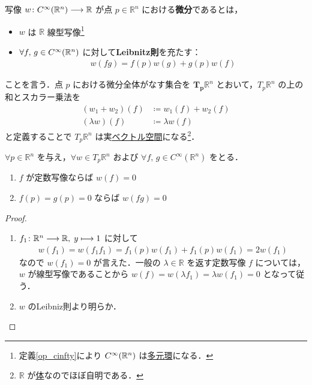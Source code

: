 \documentclass[geometry_main]{subfiles}
\begin{document}
写像 $w \colon C^\infty(\mathbb{R}^n) \longrightarrow \mathbb{R}$ が点 $p \in \mathbb{R}^n$ における\textbf{微分}であるとは，
\begin{itemize}
	\item $w$ は $\mathbb{R}$ 線型写像\footnote{定義\ref{op_cinfty}により $C^\infty(\mathbb{R}^n)$ は\hyperref[ax.alg]{多元環}になる．}
	\item $\forall f,\, g \in C^\infty(\mathbb{R}^n)$ に対して\textbf{Leibnitz則}を充たす：
	\begin{align}
		w(fg) = f(p) w(g) + g(p) w(f)
	\end{align}
\end{itemize}
ことを言う．点 $p$ における微分全体がなす集合を $\bm{T_p} \mathbb{R}^n$ とおいて，$T_p \mathbb{R}^n$ の上の和とスカラー乗法を
\begin{align}
	(w_1 + w_2)(f) &\coloneqq w_1(f) + w_2(f) \\
	(\lambda w)(f) &\coloneqq \lambda w(f)
\end{align}
と定義することで $T_p \mathbb{R}^n$ は実\hyperref[ax.vector]{ベクトル空間}になる\footnote{$\mathbb{R}$ が\hyperref[ax.ring]{体}なのでほぼ自明である．}．

\begin{mylem}[label=lem:tangentv-Rn]{}
	$\forall p \in \mathbb{R}^n$ を与え，$\forall w \in T_p \mathbb{R}^n$ および $\forall f,\, g \in C^\infty(\mathbb{R}^n)$ をとる．
	\begin{enumerate}
		\item $f$ が定数写像ならば $w(f) = 0$
		\item $f(p) = g(p) = 0$ ならば $w(fg) = 0$
	\end{enumerate}
\end{mylem}

\begin{proof}
	\begin{enumerate}
		\item $f_1 \colon \mathbb{R}^n \longrightarrow \mathbb{R},\; y \longmapsto 1$ に対して
		\begin{align}
			w(f_1) = w(f_1f_1) = f_1(p) w(f_1) + f_1(p) w(f_1) = 2 w(f_1)
		\end{align}
		なので $w(f_1) = 0$ が言えた．一般の $\lambda \in \mathbb{R}$ を返す定数写像 $f$ については，$w$ が線型写像であることから $w(f) = w(\lambda f_1) = \lambda w(f_1) = 0$ となって従う．
		\item $w$ のLeibniz則より明らか．
	\end{enumerate}
\end{proof}
\end{document}
